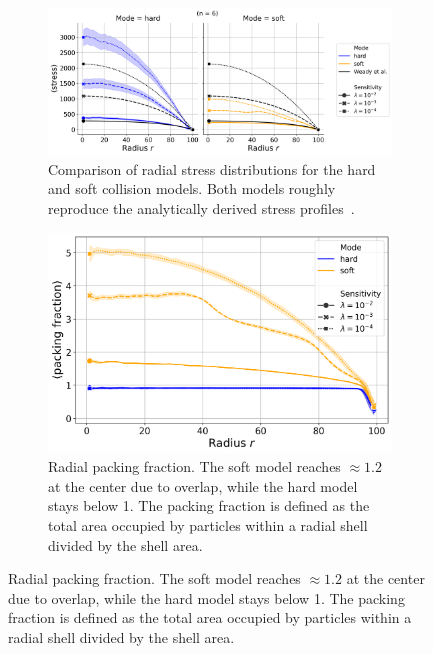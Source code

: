 \documentclass[conference]{IEEEtran}
\begin{document}
\begin{figure}[H]
    \centering
    \begin{subfigure}[b]{\linewidth}
        \centering
        \includegraphics[width=\linewidth]{figures/comparison_plots/combined_stress_shared.png}
        \caption{Comparison of radial stress distributions for the hard and soft collision models. Both models roughly reproduce the analytically derived stress profiles~\cite{Weady2024}.}
        \label{fig:radial_distribution_stress}
    \end{subfigure}

    \vspace{0.5em}

    \begin{subfigure}[b]{\linewidth}
        \centering
        \includegraphics[width=\linewidth]{figures/comparison_plots/combined_radial_packing_fraction.png}
        \caption{Radial packing fraction. The soft model reaches $\approx1.2$ at the center due to overlap, while the hard model stays below 1. The packing fraction is defined as the total area occupied by particles within a radial shell divided by the shell area.}
        \label{fig:radial_distribution_packing_fraction}
    \end{subfigure}


\end{figure}
\end{document}
